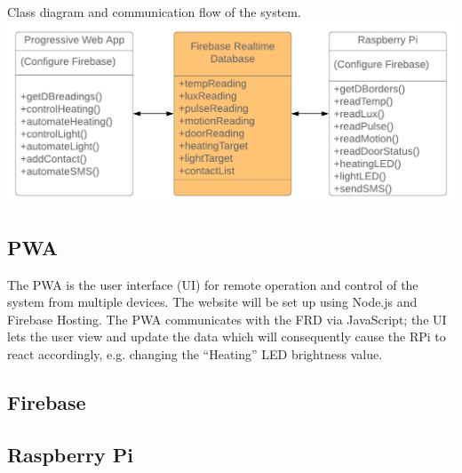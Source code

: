 \documentclass[final]{cmpreport}
\begin{document}
    \begin{cmpfigure}[htb]{Class diagram and communication flow of the system.\label{figClass}}
	\includegraphics[width=\textwidth]{Class_Diagram.png}
    \end{cmpfigure}
        
    \subsection{PWA} %
    
    The PWA is the user interface (UI) for remote operation and control of the system from multiple devices. The website will be set up using Node.js and Firebase Hosting. The PWA communicates with the FRD via JavaScript; the UI lets the user view and update the data which will consequently cause the RPi to react accordingly, e.g. changing the ``Heating'' LED brightness value.
    
    
    
    
    \subsection{Firebase} %
    
    
    
    \subsection{Raspberry Pi} %
    
    
\end{document}
